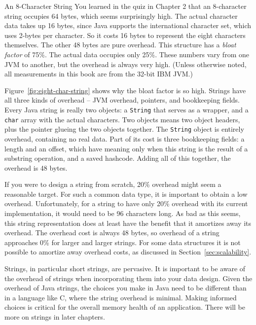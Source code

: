 \begin{example}{An 8-Character String}
 You learned in the quiz in Chapter 2 that an 8-character string occupies 64
 bytes, which seems surprisingly high. The actual character data takes up 16
 bytes, since Java supports the international character set, which uses 2-bytes
 per character. So it costs 16 bytes to represent the eight characters
 themselves. The other 48 bytes are pure overhead. This structure has a
 \emph{bloat factor} of 75\%. The actual data occupies only 25\%. These numbers
 vary from one JVM to another, but the overhead is always very high. (Unless
 otherwise noted, all measurements in this book are from the 32-bit IBM
 \javasix JVM.)

Figure~\ref{fig:eight-char-string} shows why the bloat factor is so high. Strings have all three kinds of overhead -- JVM overhead, pointers, and bookkeeping fields. Every Java string is really two objects: a {\tt String} that serves as a wrapper, and a {\tt char} array with the actual characters. Two objects means two object headers, plus the pointer glueing the two objects together. The {\tt String} object is entirely overhead, containing no real data. Part of its cost is three bookkeeping fields: a length and an offset, which have meaning only when this string is the result of a substring operation, and a saved hashcode. Adding all of this together, the overhead is 48 bytes.  
\end{example}
If you were to design a string from scratch, 20\%
overhead might seem a reasonable target. For such a common data type, it is important to obtain a low overhead.
Unfortunately, for a string to have only 20\% overhead with its current implementation, it would need
to be 96 characters long. As bad as this seems, this string
representation does at least have the benefit that it amortizes away
its overhead. The overhead cost is always 48 bytes, so overhead of a string approaches 0\% for larger and larger strings.  For some data structures it is not possible to
amortize away overhead costs, as discussed in
Section~\ref{sec:scalability}.

Strings, in particular short strings, are pervasive. It is important to be aware of the overhead of strings when incorporating them into your data design. Given the overhead of Java strings, the choices you make in Java need to be different than in a language like C, where the string overhead is minimal. Making informed choices is critical for the overall memory health of an application. There will be more on strings in later chapters.

